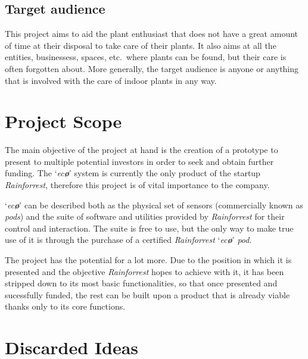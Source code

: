 \documentclass[english,runningheads,a4paper]{llncs}[2018/03/10]
\begin{document}

    \subsection*{Target audience}

    This project aims to aid the plant enthusiast that does not have a great
    amount of time at their disposal to take care of their plants. It also aims
    at all the entities, businessess, spaces, etc.\ where plants can be found, 
    but their care is often forgotten about. More generally, the target audience
    is anyone or anything that is involved with the care of indoor plants in any
    way.


\section*{Project Scope}

The main objective of the project at hand is the creation of a prototype to
present to multiple potential investors in order to seek and obtain further
funding. The `\textit{ec\textbf{\o}}' system is currently the only product of
the startup \textit{Rainforrest}, therefore this project is of vital importance
to the company.

`\textit{ec\textbf{\o}}' can be described both as the physical set of sensors
(commercially known as \textit{pods}) and the suite of software and utilities
provided by \textit{Rainforrest} for their control and interaction. The suite is
free to use, but the only way to make true use of it is through the purchase of
a certified \textit{Rainforrest} `\textit{ec\textbf{\o}}' \textit{pod}.

The project has the potential for a lot more. Due to the position in which it is
presented and the objective \textit{Rainforrest} hopes to achieve with it, it
has been stripped down to its most basic functionalities, so that once presented
and sucessfully funded, the rest can be built upon a product that is already
viable thanks only to its core functions.


\section*{Discarded Ideas}
\end{document}
